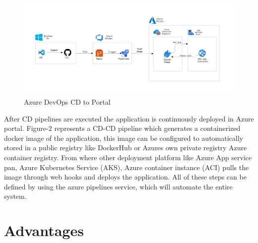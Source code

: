 \documentclass{article}
\begin{document}
\par

\begin{figure}[htp]
    \centering
    \includegraphics[width=14cm]{Azure_pipeline_diagram_CD}
    \caption{Azure DevOps CD to Portal}
    \label{fig:azure-devops-ci-cd-pipeline-workflow}
\end{figure}

\par

After CD pipelines are executed the application is continuously deployed in Azure portal. Figure-2 represents a CD-CD pipeline which generates a containerized docker image of the application, this image can be configured to automatically stored in a public registry like DockerHub or Azures own private registry Azure container registry. From where other deployment platform like Azure App service pan, Azure Kubernetes Service (AKS), Azure container instance (ACI) pulls the image through web hooks and deploys the application. All of these steps can be defined by using the azure pipelines service, which will automate the entire system. 

\section{Advantages}
\end{document}
